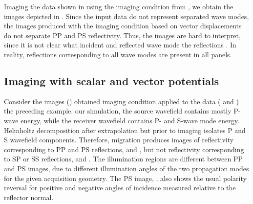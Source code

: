 Imaging the data shown in  \geosout{\&}
 using the imaging condition from , we obtain
the images depicted in  \geosout{\&}
.    Since the input
data do not represent separated wave modes, the images produced with
the imaging condition based on vector displacements do not separate PP
and PS reflectivity. Thus, the images are hard to interpret, since it
is not clear what incident and reflected wave mode
the reflections . In reality,
reflections corresponding to all wave modes are present in all panels.


\subsection{Imaging with scalar and vector potentials}

Consider the images ()
obtained  imaging condition
applied to the data
( and ) 
 the preceding example. 
our simulation, the source wavefield contains mostly P-wave energy,
while the receiver wavefield contains P- and S-wave mode
energy. Helmholtz decomposition after extrapolation but prior to
imaging isolates P and S wavefield components. Therefore, migration
produces images of reflectivity corresponding to PP and PS
reflections,  and , but
not reflectivity corresponding to SP or SS reflections,
 and . The illumination
regions are different between PP and PS images, due to different
illumination angles of the two propagation modes for the given
acquisition geometry. The PS image, , also shows
the usual polarity reversal for positive and negative angles of
incidence measured relative to the reflector normal.  

